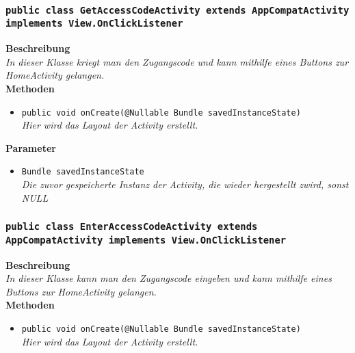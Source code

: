 \documentclass[a4paper]{scrreprt}
\begin{document}
        \subsubsection{\texttt{public class GetAccessCodeActivity extends AppCompatActivity implements View.OnClickListener}}
               
               	\textbf{Beschreibung} \\
      	        \textit{In dieser Klasse kriegt man den Zugangscode und kann mithilfe eines Buttons zur HomeActivity gelangen.} \\
                
                \textbf{Methoden}
                \begin{itemize}
        		\item\texttt{{public void onCreate(@Nullable Bundle savedInstanceState)}}\\
                \textit{Hier wird das Layout der Activity erstellt.}\\
                \end{itemize}
                
                \textbf{Parameter}
                \begin{itemize}
        		\item\texttt{Bundle savedInstanceState}\\  
                \textit{Die zuvor gespeicherte Instanz der Activity, die wieder hergestellt zwird, sonst NULL}\\
                \end{itemize}  
                
        \subsubsection{\texttt{public class EnterAccessCodeActivity extends AppCompatActivity implements View.OnClickListener}}
               
               	\textbf{Beschreibung} \\
      	        \textit{In dieser Klasse kann man den Zugangscode eingeben und kann mithilfe eines Buttons zur HomeActivity gelangen.} \\
                
                \textbf{Methoden}
                \begin{itemize}
        		\item\texttt{{public void onCreate(@Nullable Bundle savedInstanceState)}}\\
                \textit{Hier wird das Layout der Activity erstellt.}\\
                \end{itemize}
                
\end{document}
